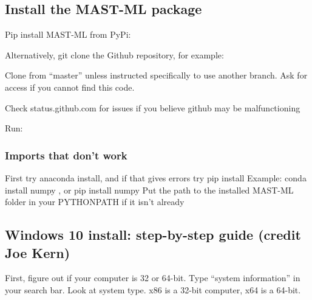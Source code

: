 \documentclass[letterpaper,10pt,english]{sphinxmanual}
\begin{document}
\subsection{Install the MAST-ML package}
\label{\detokenize{0_2_windows_installation:install-the-mast-ml-package}}
Pip install MAST-ML from PyPi:

\begin{sphinxVerbatim}[commandchars=\\\{\}]
  
\end{sphinxVerbatim}

Alternatively, git clone the Github repository, for example:

\begin{sphinxVerbatim}[commandchars=\\\{\}]
  
\end{sphinxVerbatim}

Clone from “master” unless instructed specifically to use another branch.
Ask for access if you cannot find this code.

Check status.github.com for issues if you believe github may be malfunctioning

Run:

\begin{sphinxVerbatim}[commandchars=\\\{\}]
  
\end{sphinxVerbatim}


\subsubsection{Imports that don’t work}
\label{\detokenize{0_2_windows_installation:imports-that-dont-work}}
First try anaconda install, and if that gives errors try pip install
Example: conda install numpy , or pip install numpy
Put the path to the installed MAST-ML folder in your PYTHONPATH if it isn’t already


\subsection{Windows 10 install: step-by-step guide (credit Joe Kern)}
\label{\detokenize{0_2_windows_installation:windows-10-install-step-by-step-guide-credit-joe-kern}}
First, figure out if your computer is 32 or 64-bit. Type “system information” in your search bar. Look at system type. x86 is a 32-bit computer, x64 is a 64-bit.
\end{document}
